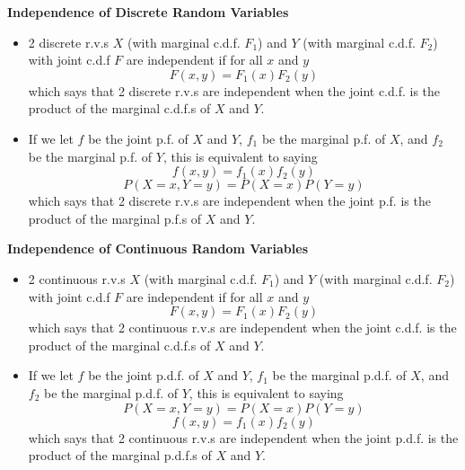 \documentclass[11pt]{article}
\begin{document}
\textbf{Independence of Discrete Random Variables}
\begin{itemize}
    \item 2 discrete r.v.s $X$ (with marginal c.d.f. $F_1$) and $Y$ (with marginal c.d.f. 
    $F_2$) with joint c.d.f $F$ are independent if for all $x$ and $y$ 
    \[F(x,y) = F_1(x)F_2(y)\]
    which says that 2 discrete r.v.s are independent when the joint c.d.f. is the product of 
    the marginal c.d.f.s of $X$ and $Y$.
    \item If we let $f$ be the joint p.f. of $X$ and $Y$, $f_1$ be the marginal p.f. of $X$, 
    and $f_2$ be the marginal p.f. of $Y$, this is equivalent to saying
    \[ f(x,y) = f_1(x)f_2(y) \]
    \[ P(X=x, Y=y) = P(X=x)P(Y=y) \]
    which says that 2 discrete r.v.s are independent when the joint p.f. is the product of the 
    marginal p.f.s of $X$ and $Y$.
\end{itemize}

\textbf{Independence of Continuous Random Variables}
\begin{itemize}
    \item 2 continuous r.v.s $X$ (with marginal c.d.f. $F_1$) and $Y$ (with marginal c.d.f. 
    $F_2$) with joint c.d.f $F$ are independent if for all $x$ and $y$ 
    \[F(x,y) = F_1(x)F_2(y)\]
    which says that 2 continuous r.v.s are independent when the joint c.d.f. is the product of 
    the marginal c.d.f.s of $X$ and $Y$.
    \item If we let $f$ be the joint p.d.f. of $X$ and $Y$, $f_1$ be the marginal p.d.f. of $X$, 
    and $f_2$ be the marginal p.d.f. of $Y$, this is equivalent to saying
    \[ P(X=x, Y=y) = P(X=x)P(Y=y)\]
    \[ f(x,y) = f_1(x)f_2(y)\]
    which says that 2 continuous r.v.s are independent when the joint p.d.f. is the product of 
    the marginal p.d.f.s of $X$ and $Y$.
\end{itemize}
\end{document}
